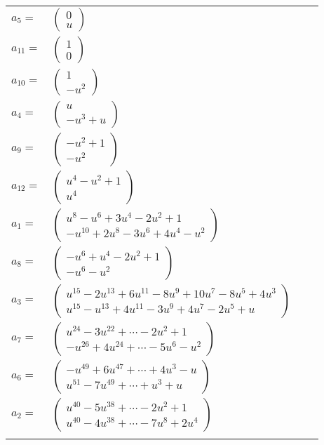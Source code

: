 \documentclass[1p]{elsarticle_modified}
\theoremstyle{definition}
\begin{document}
\begin{tabular}{m{7pt} m{180pt} m{7pt} m{180pt} }
\flushright $a_{5}=$&$\begin{pmatrix}0\\u\end{pmatrix}$ \\
\flushright $a_{11}=$&$\begin{pmatrix}1\\0\end{pmatrix}$ \\
\flushright $a_{10}=$&$\begin{pmatrix}1\\- u^2\end{pmatrix}$ \\
\flushright $a_{4}=$&$\begin{pmatrix}u\\- u^3+u\end{pmatrix}$ \\
\flushright $a_{9}=$&$\begin{pmatrix}- u^2+1\\- u^2\end{pmatrix}$ \\
\flushright $a_{12}=$&$\begin{pmatrix}u^4- u^2+1\\u^4\end{pmatrix}$ \\
\flushright $a_{1}=$&$\begin{pmatrix}u^8- u^6+3 u^4-2 u^2+1\\- u^{10}+2 u^8-3 u^6+4 u^4- u^2\end{pmatrix}$ \\
\flushright $a_{8}=$&$\begin{pmatrix}- u^6+u^4-2 u^2+1\\- u^6- u^2\end{pmatrix}$ \\
\flushright $a_{3}=$&$\begin{pmatrix}u^{15}-2 u^{13}+6 u^{11}-8 u^9+10 u^7-8 u^5+4 u^3\\u^{15}- u^{13}+4 u^{11}-3 u^9+4 u^7-2 u^5+u\end{pmatrix}$ \\
\flushright $a_{7}=$&$\begin{pmatrix}u^{24}-3 u^{22}+\cdots-2 u^2+1\\- u^{26}+4 u^{24}+\cdots-5 u^6- u^2\end{pmatrix}$ \\
\flushright $a_{6}=$&$\begin{pmatrix}- u^{49}+6 u^{47}+\cdots+4 u^3- u\\u^{51}-7 u^{49}+\cdots+u^3+u\end{pmatrix}$ \\
\flushright $a_{2}=$&$\begin{pmatrix}u^{40}-5 u^{38}+\cdots-2 u^2+1\\u^{40}-4 u^{38}+\cdots-7 u^8+2 u^4\end{pmatrix}$\\&\end{tabular}
\end{document}
